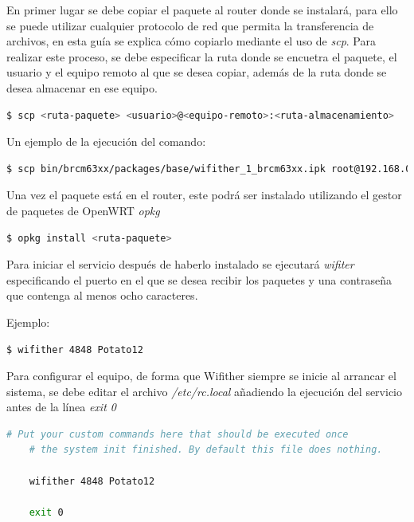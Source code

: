 \documentclass[12pt]{article}
\begin{document}
            En primer lugar se debe copiar el paquete al router donde se instalará, para ello se puede utilizar cualquier protocolo de red que permita la transferencia de archivos, en esta guía se explica cómo copiarlo mediante el uso de \textit{scp}. Para realizar este proceso, se debe especificar la ruta donde se encuetra el paquete, el usuario y el equipo remoto al que se desea copiar, además de la ruta donde se desea almacenar en ese equipo.

            \begin{lstlisting}[language=bash]
    $ scp <ruta-paquete> <usuario>@<equipo-remoto>:<ruta-almacenamiento>
            \end{lstlisting}

            Un ejemplo de la ejecución del comando:
            \begin{lstlisting}[language=bash]
    $ scp bin/brcm63xx/packages/base/wifither_1_brcm63xx.ipk root@192.168.0.4:/root/wifither
            \end{lstlisting}

            Una vez el paquete está en el router, este podrá ser instalado utilizando el gestor de paquetes de OpenWRT \textit{opkg}
            \begin{lstlisting}[language=bash]
    $ opkg install <ruta-paquete>
            \end{lstlisting}

            Para iniciar el servicio después de haberlo instalado se ejecutará \textit{wifiter} especificando el puerto en el que se desea recibir los paquetes y una contraseña que contenga al menos ocho caracteres.

            Ejemplo:
            \begin{lstlisting}[language=bash]
    $ wifither 4848 Potato12
            \end{lstlisting}

            Para configurar el equipo, de forma que Wifither siempre se inicie al arrancar el sistema, se debe editar el archivo \textit{/etc/rc.local} añadiendo la ejecución del servicio antes de la línea \textit{exit 0}

            \begin{lstlisting}[language=bash]
    # Put your custom commands here that should be executed once
    # the system init finished. By default this file does nothing.

    wifither 4848 Potato12

    exit 0
            \end{lstlisting}
\end{document}
